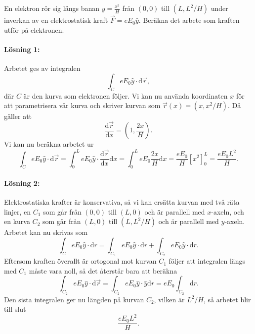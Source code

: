 \documentclass[%
oneside,                 %
final,                   %
10pt]{article}
\newenvironment{notice_mdfboxadmon}[1][]{
\begin{notice_mdfboxmdframed}[frametitle=#1]
}
{
\end{notice_mdfboxmdframed}
}
\begin{document}
\begin{notice_mdfboxadmon}

En elektron rör sig längs banan $y = \frac{x^2}{H}$ från $(0,0)$ till $(L,L^2/H)$ under inverkan av en elektrostatisk kraft $\vec{F} = e E_0\hat{y}$.  Beräkna det arbete som kraften utför på elektronen.

\paragraph{Lösning 1:}
Arbetet ges av integralen
\begin{equation}
  \int_C eE_0 \hat{y} \cdot \mbox{d}\vec{r},
\end{equation}
där $C$ är den kurva som elektronen följer.  Vi kan nu använda koordinaten $x$ för att parametrisera vår kurva och skriver kurvan som $\vec{r}(x) = (x, x^2/H)$.  Då gäller att
\begin{equation}
  \frac{\mbox{d}\vec{r}}{\mbox{d}x} = \left(1,\frac{2x}{H}\right).
\end{equation}
Vi kan nu beräkna arbetet ur
\begin{equation}
  \int_C eE_0 \hat{y} \cdot \mbox{d}\vec{r} = \int_0^LeE_0 \hat{y} \cdot
\frac{\mbox{d}\vec{r}}{\mbox{d}x} \mbox{d}x = \int_0^LeE_0 \frac{2x}{H} 
\mbox{d}x = \frac{eE_0}{H} \left[x^2\right]_0^L = \frac{e E_0 L^2}{H}.
\end{equation}

\paragraph{Lösning 2:}
Elektrostatiska krafter är konservativa, så vi kan ersätta kurvan med två räta linjer, en $C_1$ som går från $(0,0)$ till $(L,0)$ och är parallell med $x$-axeln, och en kurva $C_2$ som går från $(L,0)$ till $(L,L^2/H)$ och är parallell med $y$-axeln. Arbetet kan nu skrivas som
\begin{equation}
   \int_C eE_0 \hat{y} \cdot \mbox{d}r = \int_{C_1} eE_0 
\hat{y} \cdot \mbox{d}r + \int_{C_2} eE_0 \hat{y} \cdot \mbox{d}r.
\end{equation}
Eftersom kraften överallt är ortogonal mot kurvan $C_1$ följer att 
integralen längs med $C_1$ måste vara noll, så det återstår bara att beräkna
\begin{equation}
\int_{C_2} eE_0 \hat{y} \cdot \mbox{d} \vec{r} = \int_{C_2} 
e E_0 \hat{y} \cdot \hat{y} \mbox{d}r = e E_0 \int_{C_2} \mbox{d}r.
\end{equation}
Den sista integralen ger nu längden på kurvan $C_2$, vilken är $L^2/H$,
så arbetet blir till slut
\begin{equation}
  \frac{e E_0 L^2}{H}.
\end{equation}
\end{notice_mdfboxadmon} %
\end{document}
